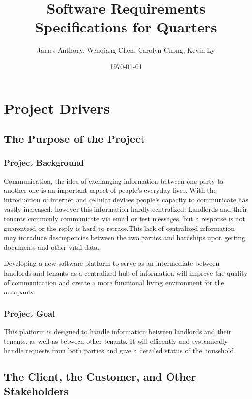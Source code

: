\documentclass[12pt]{article}
\begin{document}
\title{Software Requirements Specifications for Quarters} 
\author{James Anthony, Wenqiang Chen, Carolyn Chong, Kevin Ly}
\date{\today}
\maketitle

\pagebreak
\tableofcontents 

\pagebreak
\section{Project Drivers}
\subsection{The Purpose of the Project}
\subsubsection{Project Background}
Communication, the idea of exchanging information between one party to another 
one is an important aspect of people's everyday lives. With the introduction 
of internet and cellular devices people's capacity to communicate has vastly 
increased, however this information hardly centralized. Landlords and their 
tenants commonly communicate via email or test messages, but a response is not 
guarenteed or the reply is hard to retrace.This lack of centralized 
information may introduce descrepencies between the two parties and hardships 
upon getting documents and other vital data.

Developing a new software platform to serve as an intermediate between 
landlords and tenants  as a centralized hub of information will improve 
the quality of communication and create a more functional living environment 
for the occupants.

\subsubsection{Project Goal}
This platform is designed to handle information between landlords and their 
tenants, as well as between other tenants. It will efficently and systemically 
handle requests from both parties and give a detailed status of the household.

\subsection{The Client, the Customer, and Other Stakeholders}
\end{document}
